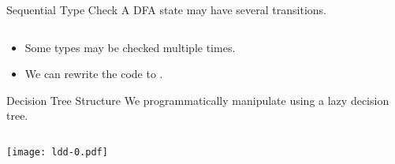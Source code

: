 \newsavebox\typecaseJhbox
\begin{lrbox}{\typecaseJhbox}
  \begin{minipage}{8cm}
    
  \end{minipage}
\end{lrbox}

\newsavebox\typecaseKbox
\begin{lrbox}{\typecaseKbox}
  \begin{minipage}{8cm}
    
  \end{minipage}
\end{lrbox}


\newsavebox\typecaseKhbox
\begin{lrbox}{\typecaseKhbox}
  \begin{minipage}{8cm}
    
  \end{minipage}
\end{lrbox}



\begin{frame}[t]{Sequential Type Check}
  A DFA state may have several  transitions.
  \begin{columns}
    \begin{column}{0.5\textwidth}
      \scalebox{0.9}{}
    \end{column}
    \begin{column}{0.5\textwidth}  %
    \end{column}    
  \end{columns}

  \begin{itemize}
  \item<1->{Some types may be checked multiple times.}
  \item<2>{We can rewrite the code to .}
  \end{itemize}

\end{frame}

\begin{frame}{Decision Tree Structure}
  We programmatically manipulate  using a lazy decision tree.

  \begin{columns}
    \begin{column}{0.5\textwidth}
      \texttt{[image: ldd-0.pdf]}
    \end{column}
    \begin{column}{0.5\textwidth}  %
      \usebox\typecaseAbox
    \end{column}    
  \end{columns}
\end{frame}

